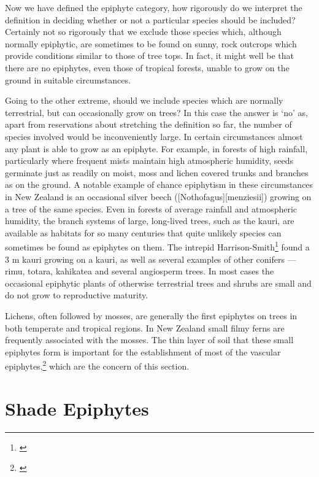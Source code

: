 Now we have defined the epiphyte category, how rigorously do we interpret the definition in deciding whether or not a particular species should be included? Certainly not so rigorously that we exclude those species which, although normally epiphytic, are sometimes to be found on sunny, rock outcrops which provide conditions similar to those of tree tops.
In fact, it might well be that there are no epiphytes, even those of tropical forests, unable to grow on the ground in suitable circumstances.

Going to the other extreme, should we include species which are normally terrestrial, but can occasionally grow on trees? In this case the answer is `no' as, apart from reservations about stretching the definition so far, the number of species involved would be inconveniently large.
In certain circumstances almost any plant is able to grow as an epiphyte.
For example, in forests of high rainfall, particularly where frequent mists maintain high atmospheric humidity, seeds germinate just as readily on moist, moss and lichen covered trunks and branches as on the ground.
A notable example of chance epiphytism in these circumstances in New Zealand is an occasional silver beech ([Nothofagus][menziesii]) growing on a tree of the same species.
Even in forests of average rainfall and atmospheric humidity, the branch systems of large, long-lived trees, such as the kauri, are available as habitats for so many centuries that quite unlikely species can sometimes be found as epiphytes on them.
The intrepid Harrison-Smith\footnote{\cite{harrisonsmith1938kauri}} found a 3 m kauri growing on a kauri, as well as several examples of other conifers --- rimu, totara, kahikatea and several angiosperm trees.
In most cases the occasional epiphytic plants of otherwise terrestrial trees and shrubs are small and do not grow to reproductive maturity.

Lichens, often followed by mosses, are generally the first epiphytes on trees in both temperate and tropical regions.
In New Zealand small filmy ferns are frequently associated with the mosses.
The thin layer of soil that these small epiphytes form is important for the establishment of most of the vascular epiphytes,\footnote{\cite{oliver1930new}} which are the concern of this section.

\section{Shade Epiphytes}


